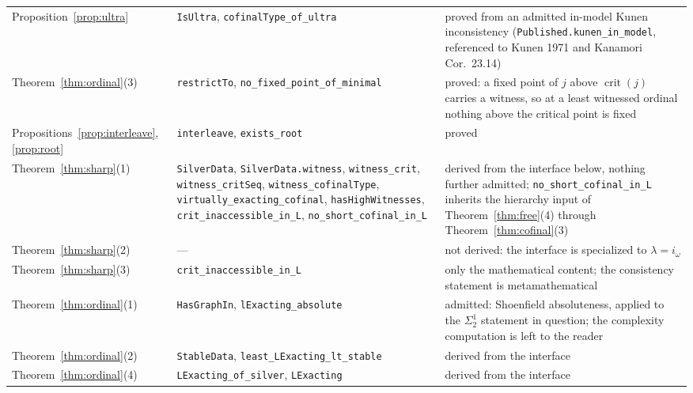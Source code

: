 \documentclass[11pt,letterpaper]{article}
\theoremstyle{definition}
\numberwithin{equation}{section}
\newcommand{\crit}{\operatorname{crit}}
\begin{document}
\begin{longtable}{@{}P{.24\textwidth}P{.34\textwidth}P{.34\textwidth}@{}}
Proposition~\ref{prop:ultra}&\nolinkurl{IsUltra}, \nolinkurl{cofinalType_of_ultra}&proved from an admitted in-model Kunen inconsistency (\nolinkurl{Published.kunen_in_model}, referenced to Kunen 1971 and Kanamori Cor.~23.14)\\
Theorem~\ref{thm:ordinal}(3)&\nolinkurl{restrictTo}, \nolinkurl{no_fixed_point_of_minimal}&proved: a fixed point of $j$ above $\crit(j)$ carries a witness, so at a least witnessed ordinal nothing above the critical point is fixed\\
Propositions~\ref{prop:interleave}, \ref{prop:root}&\nolinkurl{interleave}, \nolinkurl{exists_root}&proved\\
Theorem~\ref{thm:sharp}(1)&\nolinkurl{SilverData}, \nolinkurl{SilverData.witness}, \nolinkurl{witness_crit}, \nolinkurl{witness_critSeq}, \nolinkurl{witness_cofinalType}, \nolinkurl{virtually_exacting_cofinal}, \nolinkurl{hasHighWitnesses}, \nolinkurl{crit_inaccessible_in_L}, \nolinkurl{no_short_cofinal_in_L}&derived from the interface below, nothing further admitted; \nolinkurl{no_short_cofinal_in_L} inherits the hierarchy input of Theorem~\ref{thm:free}(4) through Theorem~\ref{thm:cofinal}(3)\\
Theorem~\ref{thm:sharp}(2)&---&not derived: the interface is specialized to $\lambda=i_\omega$\\
Theorem~\ref{thm:sharp}(3)&\nolinkurl{crit_inaccessible_in_L}&only the mathematical content; the consistency statement is metamathematical\\
Theorem~\ref{thm:ordinal}(1)&\nolinkurl{HasGraphIn}, \nolinkurl{lExacting_absolute}&admitted: Shoenfield absoluteness, applied to the $\Sigma^1_2$ statement in question; the complexity computation is left to the reader\\
Theorem~\ref{thm:ordinal}(2)&\nolinkurl{StableData}, \nolinkurl{least_LExacting_lt_stable}&derived from the interface\\
Theorem~\ref{thm:ordinal}(4)&\nolinkurl{LExacting_of_silver}, \nolinkurl{LExacting}&derived from the interface\\
\bottomrule
\end{longtable}
\endgroup
\end{document}
